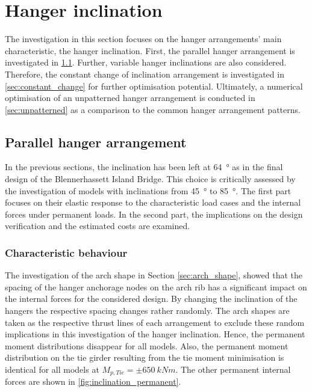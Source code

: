 \newpage
\section{Hanger inclination} \label{sec:inclination}
The investigation in this section focuses on the hanger arrangements' main characteristic, the hanger inclination. First, the parallel hanger arrangement is investigated in \cref{sec:parallel}. Further, variable hanger inclinations are also considered. Therefore, the constant change of inclination arrangement is investigated in \cref{sec:constant_change} for further optimisation potential. Ultimately, a numerical optimisation of an unpatterned hanger arrangement is conducted in \cref{sec:unpatterned} as a comparison to the common hanger arrangement patterns.


\subsection{Parallel hanger arrangement}\label{sec:parallel}
In the previous sections, the inclination has been left at \SI{64}{\degree} as in the final design of the Blennerhassett Island Bridge. This choice is critically assessed by the investigation of models with inclinations from \SI{45}{\degree} to \SI{85}{\degree}. The first part focuses on their elastic response to the characteristic load cases and the internal forces under permanent loads.  In the second part, the implications on the design verification and the estimated costs are examined. 
 
\subsubsection{Characteristic behaviour}
The investigation of the arch shape in Section \ref{sec:arch_shape}, showed that the spacing of the hanger anchorage nodes on the arch rib has a significant impact on the internal forces for the considered design. By changing the inclination of the hangers the respective spacing changes rather randomly. The arch shapes are taken as the respective thrust lines of each arrangement to exclude these random implications in this investigation of the hanger inclination. Hence, the permanent moment distributions disappear for all models. Also, the permanent moment distribution on the tie girder resulting from the tie moment minimisation is identical for all models at $M_{p,Tie}=\pm \SI{650}{kNm}$. The other permanent internal forces are shown in \cref{fig:inclination_permanent}.

